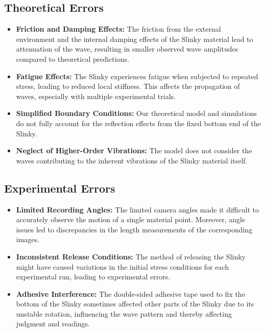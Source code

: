 \documentclass{mcmthesis}  %
\begin{document}
\subsection{Theoretical Errors}
\begin{itemize}
    \item \textbf{Friction and Damping Effects:} The friction from the external environment and the internal damping effects of the Slinky material lead to attenuation of the wave, resulting in smaller observed wave amplitudes compared to theoretical predictions.
    
    \item \textbf{Fatigue Effects:} The Slinky experiences fatigue when subjected to repeated stress, leading to reduced local stiffness. This affects the propagation of waves, especially with multiple experimental trials.
    
    \item \textbf{Simplified Boundary Conditions:} Our theoretical model and simulations do not fully account for the reflection effects from the fixed bottom end of the Slinky.
    
    \item \textbf{Neglect of Higher-Order Vibrations:} The model does not consider the waves contributing to the inherent vibrations of the Slinky material itself.
\end{itemize}

\subsection{Experimental Errors}
\begin{itemize}
    \item \textbf{Limited Recording Angles:} The limited camera angles made it difficult to accurately observe the motion of a single material point. Moreover, angle issues led to discrepancies in the length measurements of the corresponding images.
    
    \item \textbf{Inconsistent Release Conditions:} The method of releasing the Slinky might have caused variations in the initial stress conditions for each experimental run, leading to experimental errors.
    
    \item \textbf{Adhesive Interference:} The double-sided adhesive tape used to fix the bottom of the Slinky sometimes affected other parts of the Slinky due to its unstable rotation, influencing the wave pattern and thereby affecting judgment and readings.
\end{itemize}
\end{document}
